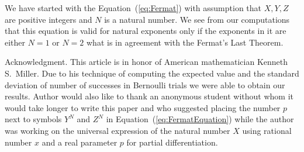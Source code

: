 \documentclass{article}
\begin{document}
We have started with the Equation~(\ref{eq:Fermat}) with assumption that $X, Y, Z$ are positive 
integers and $N$ is a natural number.
We see from our computations
that this equation is valid for natural exponents only if the exponents in it are either 
$N=1$ or $N=2$ what is in agreement with the Fermat's Last Theorem.








\begin{acknowledgment}{Acknowledgment.}
This article is in honor of American mathematician Kenneth S.~Miller. Due to his technique of computing the expected value and the standard deviation of number of successes in Bernoulli 
trials   %
we were able to obtain our results. 
Author would also like to thank an
anonymous student without whom it would take longer to
write this paper and who suggested placing the number $p$ next to symbols $Y^{N}$ and $Z^{N}$
in Equation~(\ref{eq:FermatEquation}) while the author was working on the universal expression 
of the natural number $X$ using rational number $x$ and a real parameter $p$ for partial differentiation.
\end{acknowledgment}
\end{document}
